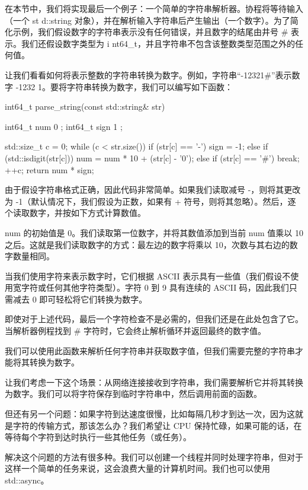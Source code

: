 
在本节中，我们将实现最后一个例子：一个简单的字符串解析器。协程将等待输入（一个 st d::string 对象），并在解析输入字符串后产生输出（一个数字）。为了简化示例，我们假设数字的字符串表示没有任何错误，并且数字的结尾由井号 \# 表示。我们还假设数字类型为 i nt64\_t，并且字符串不包含该整数类型范围之外的任何值。


让我们看看如何将表示整数的字符串转换为数字。例如，字符串“-12321\#”表示数字 -1232 1。要将字符串转换为数字，我们可以编写如下函数：

\begin{cpp}
int64_t parse_string(const std::string& str) {
    int64_t num{ 0 };
    int64_t sign { 1 };

    std::size_t c = 0;
    while (c < str.size()) {
        if (str[c] == '-') {
            sign = -1;
        }
        else if (std::isdigit(str[c])) {
            num = num * 10 + (str[c] - '0');
        }
        else if (str[c] == '#') {
            break;
        }
        ++c;
    }
    return num * sign;
}
\end{cpp}

由于假设字符串格式正确，因此代码非常简单。如果我们读取减号 -，则将其更改为 -1（默认情况下，我们假设为正数，如果有 + 符号，则将其忽略）。然后，逐个读取数字，并按如下方式计算数值。

num 的初始值是 0。我们读取第一位数字，并将其数值添加到当前 num 值乘以 10 之后。这就是我们读取数字的方式：最左边的数字将乘以 10，次数与其右边的数字数量相同。

当我们使用字符来表示数字时，它们根据 ASCII 表示具有一些值（我们假设不使用宽字符或任何其他字符类型）。字符 0 到 9 具有连续的 ASCII 码，因此我们只需减去 0 即可轻松将它们转换为数字。

即使对于上述代码，最后一个字符检查不是必需的，但我们还是在此处包含了它。当解析器例程找到 \# 字符时，它会终止解析循环并返回最终的数字值。

我们可以使用此函数来解析任何字符串并获取数字值，但我们需要完整的字符串才能将其转换为数字。

让我们考虑一下这个场景：从网络连接接收到字符串，我们需要解析它并将其转换为数字。我们可以将字符保存到临时字符串中，然后调用前面的函数。

但还有另一个问题：如果字符到达速度很慢，比如每隔几秒才到达一次，因为这就是字符的传输方式，那该怎么办？我们希望让 CPU 保持忙碌，如果可能的话，在等待每个字符到达时执行一些其他任务（或任务）。

解决这个问题的方法有很多种。我们可以创建一个线程并同时处理字符串，但对于这样一个简单的任务来说，这会浪费大量的计算机时间。我们也可以使用 std::async。

